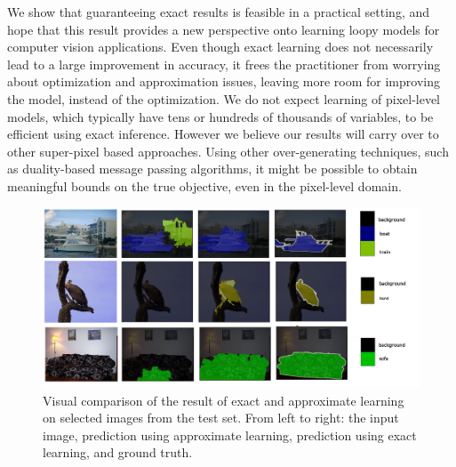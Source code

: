 We show that guaranteeing exact results is feasible in a practical setting, and
hope that this result provides a new perspective onto learning loopy models for
computer vision applications.
%
Even though exact learning does not necessarily lead to a large improvement in
accuracy, it frees the practitioner from worrying about optimization and
approximation issues, leaving more room for improving the model, instead of the
optimization.
\enlargethispage{10mm}
We do not expect learning of pixel-level models, which typically have tens or
hundreds of thousands of variables, to be efficient using exact inference. However we
believe our results will carry over to other super-pixel based approaches.
Using other over-generating techniques, such as duality-based message passing
algorithms, it might be possible to obtain meaningful bounds on the true
objective, even in the pixel-level domain.

\begin{figure}
\centering
\includegraphics[width=\linewidth]{figure}
\caption{%
    Visual comparison of the result of exact and approximate learning on
    selected images from the test set.  From left to right: the input image,
    prediction using approximate learning, prediction using exact learning, and
    ground truth.
}
\end{figure}

